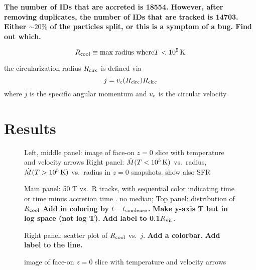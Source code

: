 \documentclass[fleqn,usenatbib]{mnras}
\newcommand{\Rcool}{R_{\rm cool}} %
\newcommand{\Mdot}{\dot{M}}
\newcommand{\Rcirc}{R_{\rm circ}} %
\begin{document}
\textbf{The number of IDs that are accreted is 18554.
However, after removing duplicates, the number of IDs that are tracked is 14703.
Either $\sim20\%$ of the particles split, or this is a symptom of a bug.
Find out which.}


\begin{equation}
    \Rcool \equiv \text{max radius where} T<10^5\,{\rm K}
\end{equation}


the circularization radius $\Rcirc$ is defined via
\begin{equation}
    j = v_{\rm c}(\Rcirc)\Rcirc
\end{equation}
where $j$ is the specific angular momentum and $v_{\rm c}$ is the circular velocity



\section{Results}


\begin{figure}
    \centering
    \caption{
    Left, middle panel: image of face-on $z=0$ slice with temperature and velocity arrows
    Right panel: $\Mdot(T<10^{5}\,{\rm K})$ vs.\ radius, $\Mdot(T>10^{5}\,{\rm K})$ vs.\ radius in $z=0$ snapshots. show also SFR}
    \label{f:Mdot}
\end{figure}


\begin{figure}
    \centering
    \caption{
    Main panel: 50 T vs.\ R tracks, with sequential color indicating time or time minus accretion time . no median;
    Top panel: distribution of $\Rcool$
    \textbf{Add in coloring by $t - t_{\rm{condense}}$.}
    \textbf{Make y-axis T but in log space (not log T).}
    \textbf{Add label to 0.1$R_{\rm vir}$.}
    }
    \label{f: T vs R}
\end{figure}

\begin{figure}
    \centering
    \caption{
    Right panel: scatter plot of $\Rcool$ vs.~$j$.
    \textbf{Add a colorbar.}
    \textbf{Add label to the line.}
    }
    \label{f:Rcool}
\end{figure}


\begin{figure}
    \centering
    \caption{image of face-on $z=0$ slice with temperature and velocity arrows}
    \label{f:slice}
\end{figure}
\end{document}
